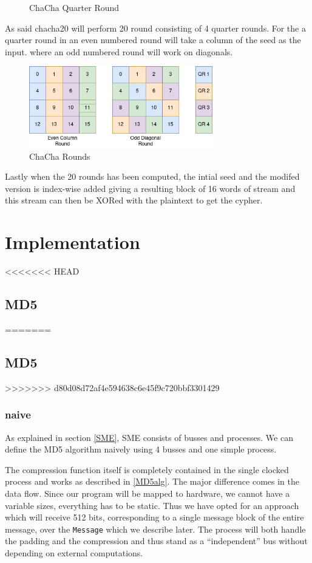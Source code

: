 \documentclass[a4paper]{article}
\begin{document}
\begin{enumerate}
\begin{figure}[!htb]
\begin{minipage}{0.4\textwidth}
\end{minipage}
\caption{ChaCha Quarter Round}
\label{fig:ChaChaQR}
\end{figure}
As said chacha20 will perform 20 round consisting of 4 quarter rounds. For the a quarter round in an even numbered round will take a column of the seed as the input. where an odd numbered round will work on diagonals.
\begin{figure}[!htb]
\centering
\includegraphics[width=8cm]{Background/diagonal.png}
\caption{ChaCha Rounds}
\label{fig:ChaChaRound}
\end{figure}
Lastly when the 20 rounds has been computed, the intial seed and the modifed version is index-wise added giving a resulting block of 16 words of stream and this stream can then be XORed with the plaintext to get the cypher.

\section{Implementation}
<<<<<<< HEAD
\label{sec:orga3f3603}
\subsection{MD5}
\label{sec:orgab624f8}
=======
\label{sec:org05fb95c}
\subsection{MD5}
\label{sec:org777389f}
>>>>>>> d80d08d72af4e594638c6e45f9c720bbf3301429

\subsubsection{naive}
\label{MD5naive}
As explained in section \ref{SME}, SME consists of busses and processes. We can define the MD5 algorithm naively using 4 busses and one simple process.


The compression function itself is completely contained in the single  clocked process and works as described in \ref{MD5alg}. The major difference comes in the data flow. Since our program will be mapped to hardware, we cannot have a variable sizes, everything has to be static. Thus we have opted for an approach which will receive 512 bits, corresponding to a single message block of the entire message, over the \texttt{Message} which we describe later. The process will both handle the padding and the compression and thus stand as a ``independent'' bus without depending on external computations.


\end{enumerate}
\end{document}
